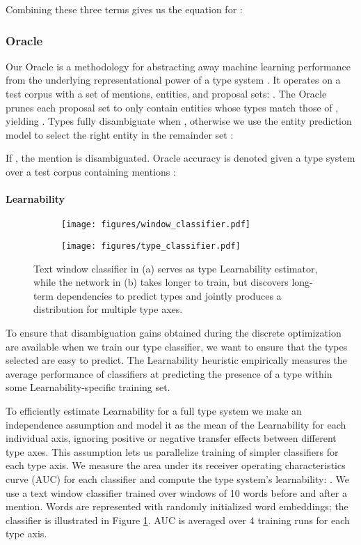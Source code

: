 \documentclass[letterpaper]{article}
\begin{document}
Combining these three terms gives us the equation for :

\subsubsection{Oracle}
\label{para:oracle}
Our Oracle is a methodology for abstracting away machine learning performance from the underlying representational power of a type system . It operates on a test corpus with a set of mentions, entities, and proposal sets: . The Oracle prunes each proposal set to only contain entities whose types match those of , yielding . Types fully disambiguate when , otherwise we use the entity prediction model to select the right entity in the remainder set :

If , the mention is disambiguated. Oracle accuracy is denoted  given a type system over a test corpus containing mentions :


\paragraph{Learnability}
\begin{figure}[ht]
    \centering
    \begin{subfigure}{0.45\linewidth}
    \texttt{[image: figures/window\_classifier.pdf]}
    \caption{}
    \label{fig:windowclassifier}
    \end{subfigure}
    \begin{subfigure}{0.45\linewidth}
    \texttt{[image: figures/type\_classifier.pdf]}
    \caption{}
    \label{fig:bilstm}
    \end{subfigure}
    \caption{Text window classifier in (a) serves as type Learnability estimator, while the network in (b) takes longer to train, but discovers long-term dependencies to predict types and jointly produces a distribution for multiple type axes.}
\end{figure}

To ensure that disambiguation gains obtained during the discrete optimization are available when we train our type classifier, we want to ensure that the types selected are easy to predict. The Learnability heuristic empirically measures the average performance of classifiers at predicting the presence of a type within some Learnability-specific training set.

To efficiently estimate Learnability for a full type system we make an independence assumption and model it as the mean of the Learnability for each individual axis, ignoring positive or negative transfer effects between different type axes. This assumption lets us parallelize training of simpler classifiers for each type axis. We measure the area under its receiver operating characteristics curve (AUC) for each classifier and compute the type system's learnability: .
We use a text window classifier trained over windows of 10 words before and after a mention. Words are represented with randomly initialized word embeddings; the classifier is illustrated in Figure \ref{fig:windowclassifier}. AUC is averaged over 4 training runs for each type axis.
\end{document}
